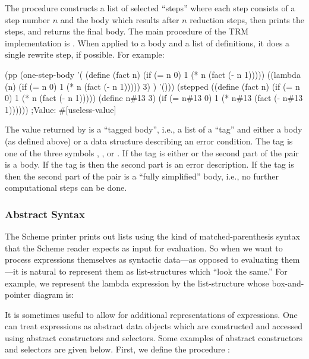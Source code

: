 The procedure  constructs a list of selected ``steps''
where each step consists of a step number $n$ and the body which
results after $n$ reduction steps, then prints the steps, and returns
the final body.  The main procedure of the TRM implementation is
.  When applied to a body and a list of
definitions, it does a single rewrite step, if possible.  For example:

\beginlispbig
(pp
 (one-step-body
  '(
    (define (fact n)
      (if (= n 0)
          1
          (* n (fact (- n 1)))))
    ((lambda (n)
       (if (= n 0)
           1
           (* n (fact (- n 1)))))
     3)
    )
  '()))
(stepped
 ((define (fact n)
    (if (= n 0)
        1
        (* n (fact (- n 1)))))
  (define n\#13 3)
  (if (= n\#13 0)
      1
      (* n\#13 (fact (- n\#13 1))))))
;Value: \#[useless-value]
\endlisp

The value returned by  is a ``tagged body'', i.e.,
a list of a ``tag'' and either a body (as defined above) or a data
structure describing an error condition.  The tag is one of the three
symbols , , or .  If the tag is
either  or  the second part of the pair is a
body.  If the tag is  then the second part is an error
description.  If the tag is  then the second part of the
pair is a ``fully simplified'' body, i.e., no further computational
steps can be done.

\subsubsection{Abstract Syntax}

The Scheme printer prints out lists using the kind of
matched-parenthesis syntax that the Scheme reader expects as input for
evaluation.  So when we want to process expressions themselves as
syntactic data---as opposed to evaluating them---it is natural to
represent them as list-structures which ``look the same.''  For example,
we represent the lambda expression  by
the list-structure whose box-and-pointer diagram is:

\begin{figure}[hbtp]
\end{figure}

It is sometimes useful to allow for additional representations of
expressions.  One can treat expressions as abstract data objects which
are constructed and accessed using abstract constructors and
selectors.  Some examples of abstract constructors and selectors are
given below.  First, we define the procedure :

